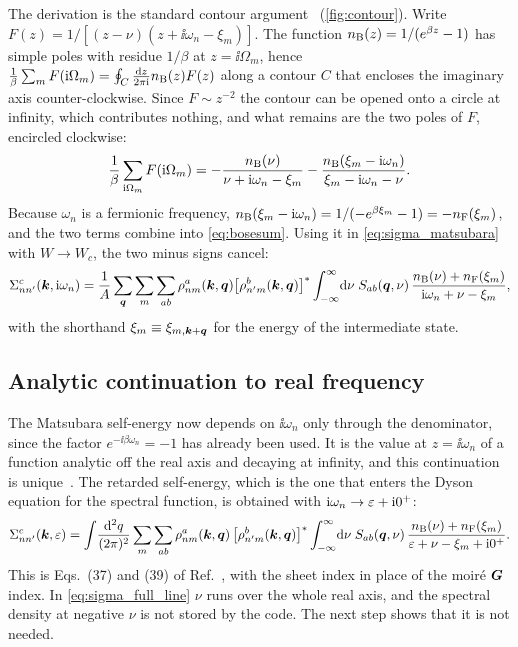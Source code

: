 The derivation is the standard contour argument~\cite{Mahan,BruusFlensberg} (\cref{fig:contour}). Write
$F(z)=1/[(z-\nu)(z+\ii\omega_n-\xi_m)]$. The function $n_{\rm B}(z)=1/(e^{\beta z}-1)$ has simple poles with residue
$1/\beta$ at $z=\ii\Omega_m$, hence $\frac1\beta\sum_mF(\mathrm i\Omega_m)=\oint_C\frac{\mathrm d z}{2\pi\mathrm i}n_{\rm B}(z)F(z)$ along a contour
$C$ that encloses the imaginary axis counter-clockwise. Since $F\sim z^{-2}$ the contour can be opened onto a circle at
infinity, which contributes nothing, and what remains are the two poles of $F$, encircled clockwise:
\begin{equation}
\frac1\beta\sum_{\mathrm i\Omega_m}F(\mathrm i\Omega_m)=-\frac{n_{\rm B}(\nu)}{\nu+\mathrm i\omega_n-\xi_m}-\frac{n_{\rm B}(\xi_m-\mathrm i\omega_n)}{\xi_m-\mathrm i\omega_n-\nu}.
\end{equation}
Because $\omega_n$ is a fermionic frequency, $n_{\rm B}(\xi_m-\mathrm i\omega_n)=1/(-e^{\beta\xi_m}-1)=-n_{\rm F}(\xi_m)$, and the two terms
combine into \cref{eq:bosesum}. Using it in \cref{eq:sigma_matsubara} with $W\to W_c$, the two minus signs cancel:
\begin{equation}
\Sigma^c_{nn'}(\bm k,\mathrm i\omega_n)=\frac1A\sum_{\bm q}\sum_m\sum_{ab}\rho^a_{nm}(\bm k,\bm q)\bigl[\rho^b_{n'm}(\bm k,\bm q)\bigr]^*
\int_{-\infty}^{\infty}\!\mathrm d\nu\;S_{ab}(\bm q,\nu)\,\frac{n_{\rm B}(\nu)+n_{\rm F}(\xi_m)}{\mathrm i\omega_n+\nu-\xi_m},
\end{equation}
with the shorthand $\xi_m\equiv\xi_{m,\bm k+\bm q}$ for the energy of the intermediate state.

\subsection{Analytic continuation to real frequency}

The Matsubara self-energy now depends on $\ii\omega_n$ only through the denominator, since the factor
$e^{-\ii\beta\omega_n}=-1$ has already been used. It is the value at $z=\ii\omega_n$ of a function analytic off the real axis
and decaying at infinity, and this continuation is unique~\cite{BaymMermin1961}. The retarded self-energy, which is the
one that enters the Dyson equation for the spectral function, is obtained with $\mathrm i\omega_n\to\varepsilon+\mathrm i0^+$:
\begin{equation}
\Sigma^{c}_{nn'}(\bm k,\varepsilon)=\int\!\frac{\mathrm d^2q}{(2\pi)^2}\sum_m\sum_{ab}\rho^a_{nm}(\bm k,\bm q)\,\bigl[\rho^b_{n'm}(\bm k,\bm q)\bigr]^*
\int_{-\infty}^{\infty}\!\mathrm d\nu\;S_{ab}(\bm q,\nu)\,\frac{n_{\rm B}(\nu)+n_{\rm F}(\xi_m)}{\varepsilon+\nu-\xi_m+\mathrm i0^+} .
\label{eq:sigma_full_line}
\end{equation}
This is Eqs.~(37) and (39) of Ref.~\cite{Wei2025}, with the sheet index in place of the moir\'e $\bm G$ index. In
\cref{eq:sigma_full_line} $\nu$ runs over the whole real axis, and the spectral density at negative $\nu$ is not stored
by the code. The next step shows that it is not needed.

